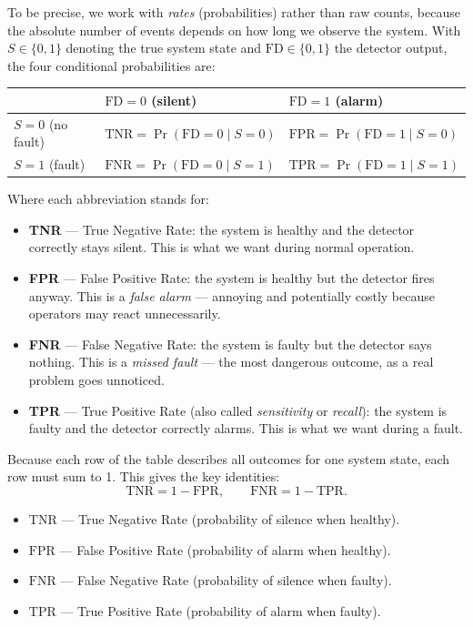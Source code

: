 \documentclass[12pt, a4paper]{article}
\begin{document}
To be precise, we work with \emph{rates} (probabilities) rather than raw
counts, because the absolute number of events depends on how long we observe
the system. With $S \in \{0,1\}$ denoting the true system state and
$\mathrm{FD} \in \{0,1\}$ the detector output, the four conditional
probabilities are:

\begin{center}
\begin{tabular}{lll}
\toprule
 & $\mathrm{FD}=0$ (silent) & $\mathrm{FD}=1$ (alarm) \\
\midrule
$S=0$ (no fault) & $\mathrm{TNR} = \Pr(\mathrm{FD}=0 \mid S=0)$ & $\mathrm{FPR} = \Pr(\mathrm{FD}=1 \mid S=0)$ \\
$S=1$ (fault)    & $\mathrm{FNR} = \Pr(\mathrm{FD}=0 \mid S=1)$ & $\mathrm{TPR} = \Pr(\mathrm{FD}=1 \mid S=1)$ \\
\bottomrule
\end{tabular}
\end{center}

Where each abbreviation stands for:
\begin{itemize}[leftmargin=1.4em, itemsep=3pt]
  \item \textbf{TNR} --- True Negative Rate: the system is healthy and the
    detector correctly stays silent. This is what we want during normal
    operation.
  \item \textbf{FPR} --- False Positive Rate: the system is healthy but the
    detector fires anyway. This is a \emph{false alarm} --- annoying and
    potentially costly because operators may react unnecessarily.
  \item \textbf{FNR} --- False Negative Rate: the system is faulty but the
    detector says nothing. This is a \emph{missed fault} --- the most dangerous
    outcome, as a real problem goes unnoticed.
  \item \textbf{TPR} --- True Positive Rate (also called \emph{sensitivity} or
    \emph{recall}): the system is faulty and the detector correctly alarms.
    This is what we want during a fault.
\end{itemize}

Because each row of the table describes all outcomes for one system state, each
row must sum to 1. This gives the key identities:
\[
  \mathrm{TNR} = 1 - \mathrm{FPR}, \qquad \mathrm{FNR} = 1 - \mathrm{TPR}.
\]
\begin{itemize}[leftmargin=1.4em, itemsep=2pt]
  \item $\mathrm{TNR}$ --- True Negative Rate (probability of silence when healthy).
  \item $\mathrm{FPR}$ --- False Positive Rate (probability of alarm when healthy).
  \item $\mathrm{FNR}$ --- False Negative Rate (probability of silence when faulty).
  \item $\mathrm{TPR}$ --- True Positive Rate (probability of alarm when faulty).
\end{itemize}
\end{document}
